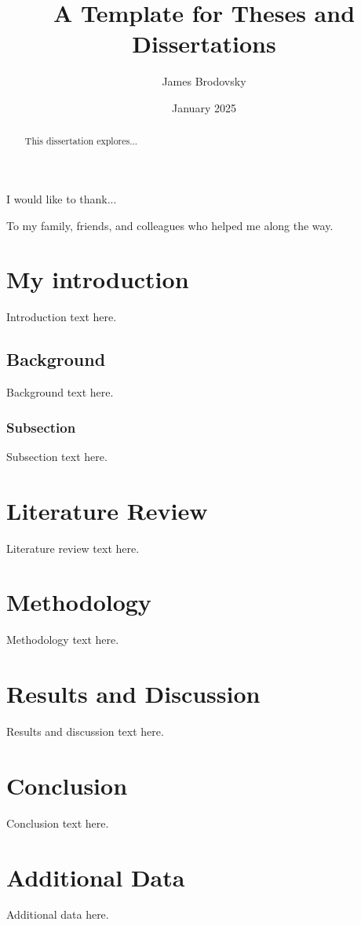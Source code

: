 \documentclass{thesis-dissertation}
\title{A Template for Theses and Dissertations}
\author{James Brodovsky}
\date{January 2025} %
\begin{document}
\maketitlepage

\begin{abstract}
  This dissertation explores...
\end{abstract}

\begin{acknowledgments}
I would like to thank...
\end{acknowledgments}

\begin{dedication}
  To my family, friends, and colleagues who helped me along the way.
\end{dedication}

\tableofcontents

\listoffigures

\listoftables

\chapter{My introduction}
Introduction text here.
\section{Background}
Background text here.
\subsection{Subsection}
Subsection text here.

\chapter{Literature Review}
Literature review text here.

\chapter{Methodology}
Methodology text here.

\chapter{Results and Discussion}
Results and discussion text here.

\chapter{Conclusion}
Conclusion text here.

\nocite{*}
\printbibliography

\appendix
\chapter{Additional Data}
Additional data here.
\end{document}
